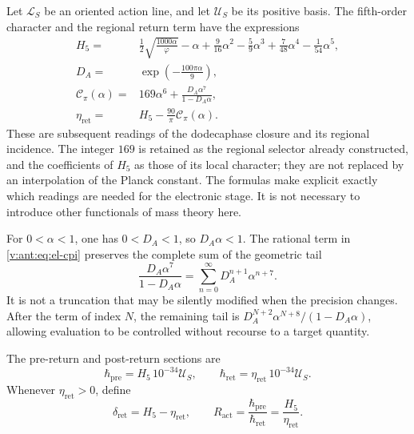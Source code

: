 Let \(\mathcal L_S\) be an oriented action line, and let \(\mathcal U_S\)
be its positive basis. The fifth-order character and the regional
return term have the expressions
\begin{align}
 H_5={}&\frac12\sqrt{\frac{1000\alpha}{\varphi}}-\alpha
   +\frac9{16}\alpha^2-\frac59\alpha^3
   +\frac7{48}\alpha^4-\frac1{54}\alpha^5,
   \label{v:ant:eq:el-h5}\\
 D_A={}&\exp\!\left(-\frac{100\pi\alpha}{9}\right),
   \label{v:ant:eq:el-da}\\
 \mathcal C_\pi(\alpha)={}&169\alpha^6+
       \frac{D_A\alpha^7}{1-D_A\alpha},
   \label{v:ant:eq:el-cpi}\\
 \eta_{\mathrm{ret}}={}&H_5-\frac{90}{\pi}\mathcal C_\pi(\alpha).
   \label{v:ant:eq:el-eta}
\end{align}
These are subsequent readings of the dodecaphase closure and its
regional incidence. The integer \(169\) is retained as the regional
selector already constructed, and the coefficients of \(H_5\) as those of its
local character; they are not replaced by an interpolation of the Planck
constant. The formulas make explicit exactly which readings are needed
for the electronic stage. It is not necessary to introduce other
functionals of mass theory here.

For \(0<\alpha<1\), one has \(0<D_A<1\), so
\(D_A\alpha<1\). The rational term in \eqref{v:ant:eq:el-cpi} preserves the
complete sum of the geometric tail
\begin{equation}
 \frac{D_A\alpha^7}{1-D_A\alpha}
 =\sum_{n=0}^{\infty}D_A^{n+1}\alpha^{n+7}.
 \label{v:ant:eq:el-cola-regional}
\end{equation}
It is not a truncation that may be silently modified when the precision
changes. After the term of index \(N\), the remaining tail is
\(D_A^{N+2}\alpha^{N+8}/(1-D_A\alpha)\), allowing evaluation to be
controlled without recourse to a target quantity.

\begin{definition}
The pre-return and post-return sections are
\begin{equation}
 \hbar_{\mathrm{pre}}=H_5\,10^{-34}\mathcal U_S,
 \qquad
 \hbar_{\mathrm{ret}}=\eta_{\mathrm{ret}}\,10^{-34}\mathcal U_S.
 \label{v:ant:eq:el-secciones-accion}
\end{equation}
Whenever \(\eta_{\mathrm{ret}}>0\), define
\begin{equation}
 \delta_{\mathrm{ret}}=H_5-\eta_{\mathrm{ret}},\qquad
 R_{\mathrm{act}}=\frac{\hbar_{\mathrm{pre}}}{\hbar_{\mathrm{ret}}}
 =\frac{H_5}{\eta_{\mathrm{ret}}}.
 \label{v:ant:eq:el-ratio}
\end{equation}
\end{definition}

